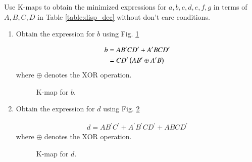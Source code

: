 Use K-maps to obtain the minimized expressions for 
$a,b,c,d,e,f,g$ in terms of $A,B,C,D$ in Table \ref{table:disp_dec} 
without don't care conditions.

\renewcommand{\theequation}{\theenumi}
\renewcommand{\thefigure}{\theenumi}
\begin{enumerate}[label=\thesubsection.\arabic*.,ref=\thesubsection.\theenumi]

\item Obtain the expression for $b$ using Fig. \ref{fig:disp_kmap_b}


\solution

\begin{align}
\label{eq:kmap_disp_b}
b &= A B^{\prime}C D^{\prime} + A^{\prime}B C D^{\prime}
\\
&=C D^{\prime}\left(A B^{\prime} \oplus A^{\prime}B\right)
\end{align}
%
where $\oplus$ denotes the XOR operation.
\begin{figure}[!ht]
\centering
\resizebox{\columnwidth}{!} {

}
\caption{K-map for $b$.}
\label{fig:disp_kmap_b}
\end{figure}
%
\item Obtain the expression for $d$ using Fig. \ref{fig:disp_kmap_d}
\solution


\begin{align}
\label{eq:kmap_disp_d}
d=AB^{\prime}C^{\prime}+A^{\prime}B^{\prime}CD^{\prime}+ABCD^{\prime}
\end{align}
%
where $\oplus$ denotes the XOR operation.
\begin{figure}[!ht]
\centering
\resizebox{\columnwidth}{!} {

}
\caption{K-map for $d$.}
\label{fig:disp_kmap_d}
\end{figure}
\end{enumerate}
%
%

